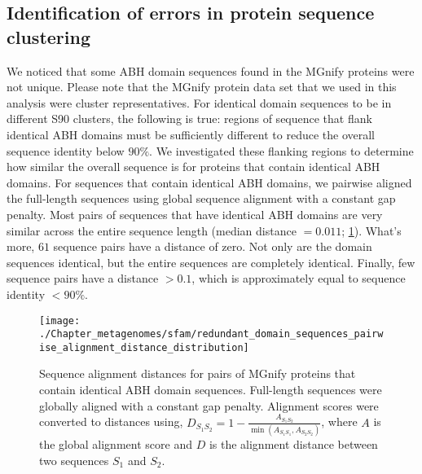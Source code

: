 \subsection{Identification of errors in protein sequence clustering}

We noticed that some ABH domain sequences found in the MGnify proteins were not unique. Please note that the MGnify protein data set that we used in this analysis were cluster representatives. For identical domain sequences to be in different S90 clusters, the following is true: regions of sequence that flank identical ABH domains must be sufficiently different to reduce the overall sequence identity below $90\%$. We investigated these flanking regions to determine how similar the overall sequence is for proteins that contain identical ABH domains. For sequences that contain identical ABH domains, we pairwise aligned the full-length sequences using global sequence alignment with a constant gap penalty. Most pairs of sequences that have identical ABH domains are very similar across the entire sequence length (median distance $= 0.011$; \ref{fig:redundant_domain_sequences_pairwise_alignment_distance_distribution}). What's more, $61$ sequence pairs have a distance of zero. Not only are the domain sequences identical, but the entire sequences are completely identical. Finally, few sequence pairs have a distance $> 0.1$, which is approximately equal to sequence identity $< 90\%$.

\begin{figure}[!hbt]
    \centering
    \texttt{[image: ./Chapter\_metagenomes/sfam/redundant\_domain\_sequences\_pairwise\_alignment\_distance\_distribution]}
    \caption{%
        Sequence alignment distances for pairs of MGnify proteins that contain identical ABH domain sequences.
        Full-length sequences were globally aligned with a constant gap penalty.
        Alignment scores were converted to distances using, $D_{S_1 S_2} = 1 - \frac{A_{S_1 S_2}}{\min(A_{S_1 S_1}, A_{S_2 S_2})}$, where $A$ is the global alignment score and $D$ is the alignment distance between two sequences $S_1$ and $S_2$.
    }
    \label{fig:redundant_domain_sequences_pairwise_alignment_distance_distribution}
\end{figure}


